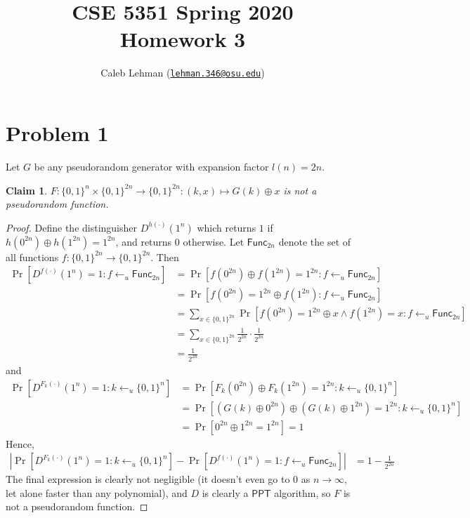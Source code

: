 \documentclass[12pt]{article}
\title{%
CSE 5351 Spring 2020\\
Homework 3
}
\author{%
Caleb Lehman
(\href{mailto:lehman.346@osu.edu}{\texttt{lehman.346@osu.edu}})
}
\date{%
}
\numberwithin{equation}{section}
\theoremstyle{plain}
\newtheorem{claim}{Claim}
\newcommand{\set}[1]{\{ #1 \}}
\DeclareMathOperator*{\prob}{Pr}
\newcommand{\ppt}{\algo{PPT}}
\newcommand{\func}{\algo{Func}}
\newcommand{\algo}[1]{\mathsf{#1}}
\newcommand{\param}{1}
\begin{document}
\maketitle

\section*{Problem 1}

Let $G$ be any pseudorandom generator with expansion factor $l(n) = 2n$.
\begin{claim}
$F: \set{ 0, 1 }^n \times \set{ 0, 1 }^{2n} \to \set{ 0, 1 }^{2n} : (k, x) \mapsto G(k) \oplus x$ is not a pseudorandom function.
\end{claim}
\begin{proof}
Define the distinguisher $D^{h(\cdot)}(\param^n)$
which returns $1$ if $h(0^{2n}) \oplus h(1^{2n}) = 1^{2n}$,
and returns $0$ otherwise.
Let $\func_{2n}$ denote the set of all functions $f : \set{ 0, 1 }^{2n} \to \set{ 0, 1 }^{2n}$.
Then
\begin{align*}
    \prob[D^{f(\cdot)}(1^n) = 1 : f \gets_u \func_{2n}]
        &= \prob[f(0^{2n}) \oplus f(1^{2n}) = 1^{2n} : f \gets_u \func_{2n}]\\
        &= \prob[f(0^{2n}) = 1^{2n} \oplus f(1^{2n}) : f \gets_u \func_{2n}]\\
        &= \sum_{x \in \set{ 0, 1 }^{2n}} \prob[f(0^{2n}) = 1^{2n} \oplus x \land f(1^{2n}) = x : f \gets_u \func_{2n}]\\
        &= \sum_{x \in \set{ 0, 1 }^{2n}} \frac{1}{2^{2n}} \cdot \frac{1}{2^{2n}}\\
        &= \frac{1}{2^{2n}}
\end{align*}
and
\begin{align*}
    \prob[D^{F_k(\cdot)}(1^n) = 1 : k \gets_u \set{ 0, 1 }^n]
        &= \prob[F_k(0^{2n}) \oplus F_k(1^{2n}) = 1^{2n} : k \gets_u \set{ 0, 1 }^n]\\
        &= \prob[\left(G(k) \oplus 0^{2n}\right) \oplus \left(G(k) \oplus 1^{2n}\right) = 1^{2n} : k \gets_u \set{ 0, 1 }^n]\\
        &= \prob[0^{2n} \oplus 1^{2n} = 1^{2n}] = 1
\end{align*}
Hence,
\begin{align*}
    |\prob[D^{F_k(\cdot)}(1^n) = 1 : k \gets_u \set{ 0, 1 }^n] - \prob[D^{f(\cdot)}(1^n) = 1 : f \gets_u \func_{2n}]|
        &= 1 - \frac{1}{2^{2n}}
\end{align*}
The final expression is clearly not negligible (it doesn't even go to $0$ as $n \to \infty$, let alone faster than any polynomial),
and $D$ is clearly a $\ppt$ algorithm,
so $F$ is not a pseudorandom function.
\end{proof}
\end{document}
